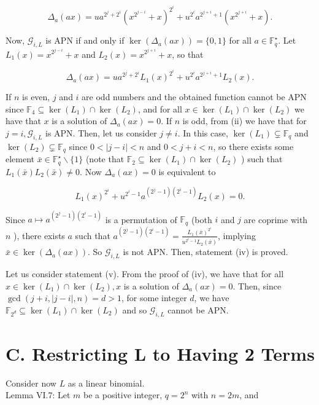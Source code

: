 \documentclass[10pt]{article}
\begin{document}
$$
\Delta_{a}(a x)=u a^{2^{j}+2^{i}}\left(x^{2^{j-i}}+x\right)^{2^{i}}+u^{2^{i}} a^{2^{j+i}+1}\left(x^{2^{j+i}}+x\right) .
$$

Now, $\mathcal{G}_{i, L}$ is APN if and only if $\operatorname{ker}\left(\Delta_{a}(a x)\right)=\{0,1\}$ for all $a \in \mathbb{F}_{q}^{\star}$. Let $L_{1}(x)=x^{2^{j-i}}+x$ and $L_{2}(x)=x^{2^{j+i}}+x$, so that

$$
\Delta_{a}(a x)=u a^{2^{j}+2^{i}} L_{1}(x)^{2^{i}}+u^{2^{i}} a^{2^{j+i}+1} L_{2}(x) .
$$

If $n$ is even, $j$ and $i$ are odd numbers and the obtained function cannot be APN since $\mathbb{F}_{4} \subseteq \operatorname{ker}\left(L_{1}\right) \cap \operatorname{ker}\left(L_{2}\right)$, and for all $x \in \operatorname{ker}\left(L_{1}\right) \cap \operatorname{ker}\left(L_{2}\right)$ we have that $x$ is a solution of $\Delta_{a}(a x)=0$. If $n$ is odd, from (ii) we have that for $j=i, \mathcal{G}_{i, L}$ is APN. Then, let us consider $j \neq i$. In this case, $\operatorname{ker}\left(L_{1}\right) \subsetneq \mathbb{F}_{q}$ and $\operatorname{ker}\left(L_{2}\right) \subsetneq \mathbb{F}_{q}$ since $0<|j-i|<n$ and $0<j+i<n$, so there exists some element $\bar{x} \in \mathbb{F}_{q}^{\star} \backslash\{1\}$ (note that $\mathbb{F}_{2} \subseteq \operatorname{ker}\left(L_{1}\right) \cap \operatorname{ker}\left(L_{2}\right)$ ) such that $L_{1}(\bar{x}) L_{2}(\bar{x}) \neq 0$. Now $\Delta_{a}(a x)=0$ is equivalent to

$$
L_{1}(x)^{2^{i}}+u^{2^{i}-1} a^{\left(2^{j}-1\right)\left(2^{i}-1\right)} L_{2}(x)=0 .
$$

Since $a \mapsto a^{\left(2^{j}-1\right)\left(2^{i}-1\right)}$ is a permutation of $\mathbb{F}_{q}$ (both $i$ and $j$ are coprime with $n$ ), there exists $a$ such that $a^{\left(2^{j}-1\right)\left(2^{i}-1\right)}= \frac{L_{1}(\bar{x})^{2^{i}}}{u^{2^{i}-1} L_{2}(\bar{x})}$, implying $\bar{x} \in \operatorname{ker}\left(\Delta_{a}(a x)\right)$. So $\mathcal{G}_{i, L}$ is not APN. Then, statement (iv) is proved.

Let us consider statement (v). From the proof of (iv), we have that for all $x \in \operatorname{ker}\left(L_{1}\right) \cap \operatorname{ker}\left(L_{2}\right), x$ is a solution of $\Delta_{a}(a x)=0$. Then, since $\operatorname{gcd}(j+i,|j-i|, n)=d>1$, for some integer $d$, we have $\mathbb{F}_{2^{d}} \subseteq \operatorname{ker}\left(L_{1}\right) \cap \operatorname{ker}\left(L_{2}\right)$ and so $\mathcal{G}_{i, L}$ cannot be APN.

\section*{C. Restricting L to Having 2 Terms}
Consider now $L$ as a linear binomial.\\
Lemma VI.7: Let $m$ be a positive integer, $q=2^{n}$ with $n=2 m$, and
\end{document}
